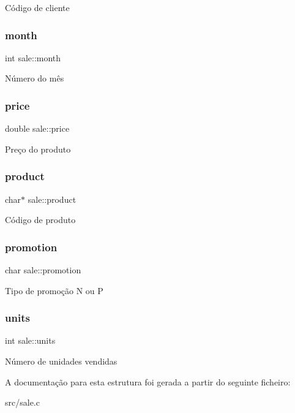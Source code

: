 Código de cliente \mbox{\label{structsale_a254bdac756c48cd89f0f34b041263f27}} 
\subsubsection{\texorpdfstring{month}{month}}
{\footnotesize\ttfamily int sale\+::month}

Número do mês \mbox{\label{structsale_aa7a6fc25a883e1f75dcc71c3dc0cef53}} 
\subsubsection{\texorpdfstring{price}{price}}
{\footnotesize\ttfamily double sale\+::price}

Preço do produto \mbox{\label{structsale_af5a0d80c7b391b3af4086f9f2b6dfc33}} 
\subsubsection{\texorpdfstring{product}{product}}
{\footnotesize\ttfamily char$\ast$ sale\+::product}

Código de produto \mbox{\label{structsale_a36cc49d9b3452fef223119fb4fa02938}} 
\subsubsection{\texorpdfstring{promotion}{promotion}}
{\footnotesize\ttfamily char sale\+::promotion}

Tipo de promoção N ou P \mbox{\label{structsale_a828620c0d49283dfbf8b4ea0a5606de8}} 
\subsubsection{\texorpdfstring{units}{units}}
{\footnotesize\ttfamily int sale\+::units}

Número de unidades vendidas 

A documentação para esta estrutura foi gerada a partir do seguinte ficheiro\+:\begin{DoxyCompactItemize}
\item 
src/sale.\+c\end{DoxyCompactItemize}
